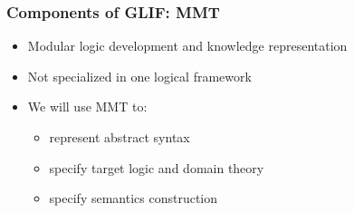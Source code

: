 \begin{frame}[fragile]
    \frametitle{Components of GLIF: MMT}
    \lstset{frame=single}
    \begin{itemize}   
        \item Modular logic development and knowledge representation
        \item Not specialized in one logical framework 
        \item We will use MMT to:
        \begin{itemize}
            \item {  represent abstract syntax }
            \item {  specify target logic and domain theory}
            \item {  specify semantics construction}
        \end{itemize}
    \end{itemize}
    \lstset{basicstyle=\footnotesize\ttfamily}
    
    \vspace{1em}
    \begin{minipage}[t][4cm]{\textwidth}
        \centering
    \end{minipage}
\end{frame}

